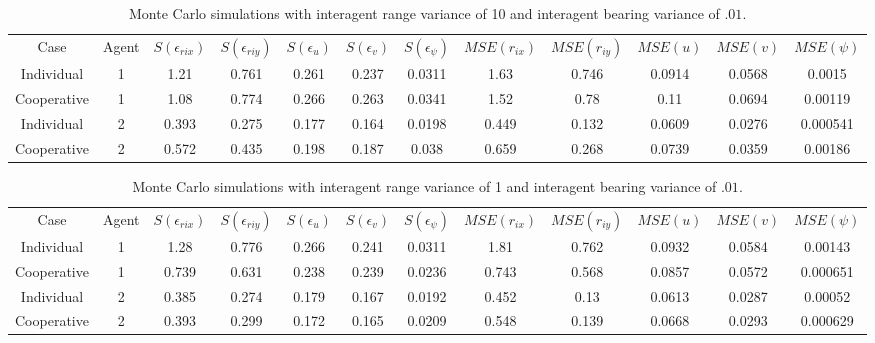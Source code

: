 \documentclass{aiaa-tc}
\begin{document}
\begin{table}[tb!]
\scriptsize
\centering
\begin{tabular}{c|c|c|c|c|c|c|c|c|c|c|c|}
Case & Agent & $S(\epsilon_{rix})$ & $S(\epsilon_{riy})$ & $S(\epsilon_{u})$ & $S(\epsilon_{v})$ & $S(\epsilon_{\psi})$ & $MSE(r_{ix})$ & $MSE(r_{iy})$ & $MSE(u)$ & $MSE(v)$ & $MSE(\psi)$ \\
Individual & 1& 1.21& 0.761& 0.261& 0.237& 0.0311& 1.63& 0.746& 0.0914& 0.0568& 0.0015 \\
Cooperative & 1& 1.08& 0.774& 0.266& 0.263& 0.0341& 1.52& 0.78& 0.11& 0.0694& 0.00119 \\
Individual & 2& 0.393& 0.275& 0.177& 0.164& 0.0198& 0.449& 0.132& 0.0609& 0.0276& 0.000541 \\
Cooperative & 2& 0.572& 0.435& 0.198& 0.187& 0.038& 0.659& 0.268& 0.0739& 0.0359& 0.00186 \\
\end{tabular}
\caption{Monte Carlo simulations with interagent range variance of 10 and interagent bearing variance of $.01$.}
\label{tab:sig_ar10}
\end{table}

\begin{table}[tb!]
\scriptsize
\centering
\begin{tabular}{c|c|c|c|c|c|c|c|c|c|c|c|}
Case & Agent & $S(\epsilon_{rix})$ & $S(\epsilon_{riy})$ & $S(\epsilon_{u})$ & $S(\epsilon_{v})$ & $S(\epsilon_{\psi})$ & $MSE(r_{ix})$ & $MSE(r_{iy})$ & $MSE(u)$ & $MSE(v)$ & $MSE(\psi)$ \\
Individual & 1& 1.28& 0.776& 0.266& 0.241& 0.0311& 1.81& 0.762& 0.0932& 0.0584& 0.00143 \\
Cooperative & 1& 0.739& 0.631& 0.238& 0.239& 0.0236& 0.743& 0.568& 0.0857& 0.0572& 0.000651 \\
Individual & 2& 0.385& 0.274& 0.179& 0.167& 0.0192& 0.452& 0.13& 0.0613& 0.0287& 0.00052 \\
Cooperative & 2& 0.393& 0.299& 0.172& 0.165& 0.0209& 0.548& 0.139& 0.0668& 0.0293& 0.000629 \\
\end{tabular}
\caption{Monte Carlo simulations with interagent range variance of 1 and interagent bearing variance of $.01$.}
\label{tab:sig_ar1}
\end{table}
\end{document}
